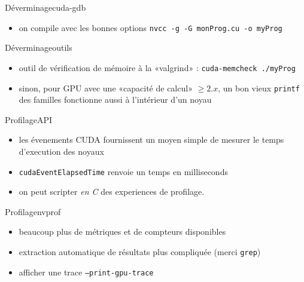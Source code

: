 \documentclass[11pt,mathserif]{beamer}
\newcommand{\scout}{\faAngellist}
\newcommand{\argi}{\faLightbulbO}
\newcommand{\kontuz}{\faExclamationTriangle}
\newcommand{\pozik}{\faSmileO}
\newcommand{\triste}{\faFrownO}
\newcommand{\harritu}{\faExclamation}
\begin{document}
\begin{frame}{Déverminage}{cuda-gdb}
  \begin{itemize}[<+->]
        \item on compile avec les bonnes options \texttt{nvcc -g -G monProg.cu -o myProg}
   \end{itemize}
\pause
  
\end{frame}

\begin{frame}{Déverminage}{outils}
  \begin{itemize}[<+->]
    \item outil de vérification de mémoire à la «valgrind» : \texttt{cuda-memcheck ./myProg}
    \item[\scout] sinon, pour GPU avec une «capacité de calcul» $\geqslant 2.x$, un bon vieux \texttt{printf} des familles fonctionne aussi
    à l'intérieur d'un noyau \harritu
  \end{itemize} 
\end{frame}

\begin{frame}{Profilage}{API}
  \begin{itemize}[<+->]
    \item[\argi] les évenements CUDA fournissent un moyen simple de mesurer le temps d'execution des noyaux
\begin{center}
  
\end{center}
   \item[\kontuz] \texttt{cudaEventElapsedTime} renvoie un temps en milliseconds
   \item[\pozik] on peut scripter {\em en C} des experiences de profilage.
  \end{itemize}
\end{frame}

\begin{frame}{Profilage}{nvprof}
  \begin{itemize}[<+->]
    \item[\pozik] beaucoup plus de métriques et de compteurs disponibles
    \item[\triste] extraction automatique de résultats plus compliquée (merci \texttt{grep})
    \item[\argi] afficher une trace {\tt --print-gpu-trace }
  \end{itemize}
\pause
\end{frame}
\end{document}
